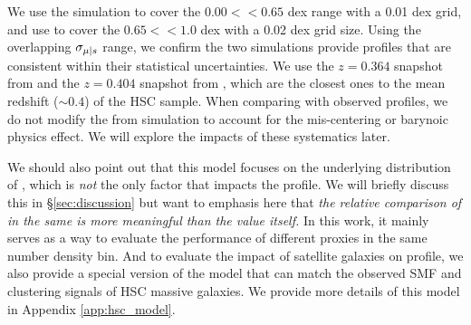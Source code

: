 \documentclass[fleqn,usenatbib,useAMS,english]{mnras}
\begin{document}
    We use the  simulation to cover the $0.00 <$\scatterMhaloObsSym{}$<0.65$ dex range
    with a 0.01 dex grid, and use \smdpl{} to cover the $0.65 <$\scatterMhaloObsSym{}$<1.0$ dex
    with a 0.02 dex grid size.
    Using the overlapping $\sigma_{\mu{} | s{}}{}$ range, we confirm the two simulations
    provide \dsigma{} profiles that are consistent within their statistical uncertainties.
    We use the $z=0.364$ snapshot from  and the $z=0.404$ snapshot from \smdpl{}, which
    are the closest ones to the mean redshift ($\sim 0.4$) of the HSC sample.
    When comparing with observed \dsigma{} profiles, we do not modify the \dsigma{} from simulation 
    to account for the mis-centering or barynoic physics effect.
    We will explore the impacts of these systematics later.

    We should also point out that this model focuses on the underlying distribution of \mvir{},
    which is \emph{not} the only factor that impacts the \dsigma{} profile.
    We will briefly discuss this in \S \ref{sec:discussion} but want to emphasis here that
    \emph{the relative comparison of \scatterMhaloObsSym{} in the same \topn{} is more
    meaningful than the value itself.}
    In this work, it mainly serves as a way to evaluate the performance of different \mhalo{}
    proxies in the same number density bin.
    And to evaluate the impact of satellite galaxies on \dsigma{} profile, we also provide a
    special version of the model that can match the observed SMF and clustering signals of HSC
    massive galaxies.
    We provide more details of this model in Appendix \ref{app:hsc_model}.
\end{document}
